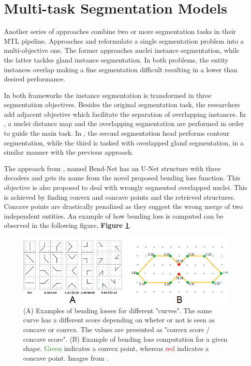 \section{Multi-task Segmentation Models}
\label{segmentatiopn_mt}

Another series of approaches combine two or more segmentation tasks in their MTL pipeline. Approaches \cite{wang2021bend} and \cite{rezazadeh2023multi} reformulate a single segmentation problem into a multi-objective one. The former approaches nuclei instance segmentation, while the latter tackles gland instance segmentation. In both problems, the entity instances overlap making a fine segmentation difficult resulting in a lower than desired performance. 

In both frameworks the instance segmentation is transformed in three segmentation objectives. Besides the original segmentation task, the researchers add adjacent objective which facilitate the separation of overlapping instances. In \cite{wang2021bend}, a nuclei distance map and the overlapping segmentation are performed in order to guide the main task. In \cite{rezazadeh2023multi}, the second segmentation head performs contour segmentation, while the third is tasked with overlapped gland segmentation, in a similar manner with the previous approach. 

The approach from \cite{wang2021bend}, named Bend-Net has an U-Net \cite{ronneberger2015u} structure with three decoders and gets its name from the novel proposed bending loss function. This objective is also proposed to deal with wrongly segmented overlapped nuclei. This is achieved by finding convex and concave points and the retrieved structures. Concave points are drastically penalized as they suggest the wrong merge of two independent entities. An example of how bending loss is computed can be observed in the following figure, \textbf{Figure \ref{bendingloss}}.

\begin{figure}[htb]
    \centering
	\centerline{\includegraphics[scale=1]{figures/bend_loss.png}}
	\caption{(A) Examples of bending losses for different "curves". The same curve has a different score depending on wheter or not is seen as concave or convex. The values are presented as "convex score / concave score". (B) Example of bending loss computation for a given shape. \textcolor{forestgreen}{Green} indicates a convex point, whereas \textcolor{red}{red} indicates a concave point. Images from \cite{wang2021bend}. }
	\label{bendingloss}
\end{figure}

